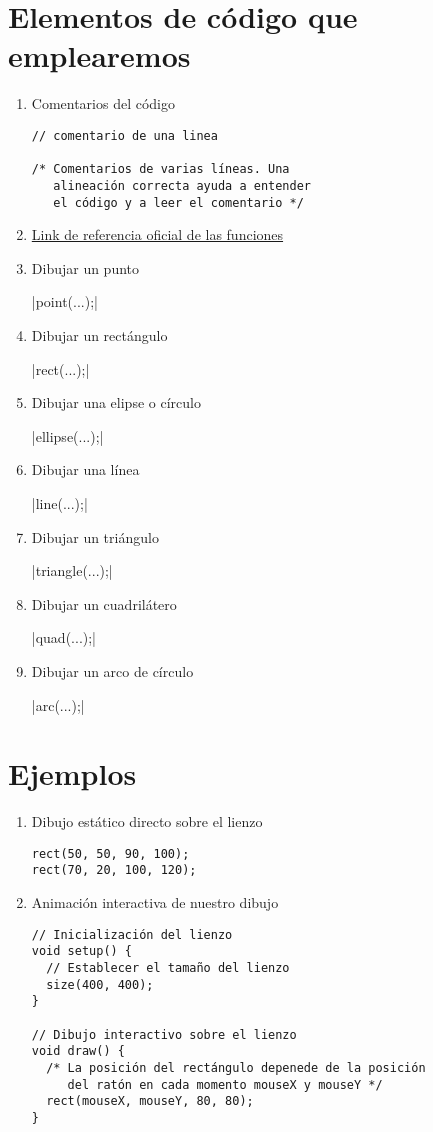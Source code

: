 \documentclass[a4paper,oneside]{article}
\begin{document}
\section{Elementos de código que emplearemos}
\begin{enumerate}
  \item Comentarios del código

    \begin{verbatim}
// comentario de una linea

/* Comentarios de varias líneas. Una
   alineación correcta ayuda a entender
   el código y a leer el comentario */
    \end{verbatim}
  \item \href{http://processing.org/reference/}{Link de referencia oficial de las funciones}
  \item Dibujar un punto

     |point(...);|
  \item Dibujar un rectángulo

     |rect(...);|
  \item Dibujar una elipse o círculo

     |ellipse(...);|
  \item Dibujar una línea

     |line(...);|
  \item Dibujar un triángulo

     |triangle(...);|
  \item Dibujar un cuadrilátero

     |quad(...);|
  \item Dibujar un arco de círculo

     |arc(...);|
\end{enumerate}


\section{Ejemplos}
\begin{enumerate}
  \item Dibujo estático directo sobre el lienzo

    \begin{verbatim}
rect(50, 50, 90, 100);
rect(70, 20, 100, 120);
    \end{verbatim}
  \item Animación interactiva de nuestro dibujo

    \begin{verbatim}
// Inicialización del lienzo
void setup() {
  // Establecer el tamaño del lienzo
  size(400, 400);
}

// Dibujo interactivo sobre el lienzo
void draw() {
  /* La posición del rectángulo depenede de la posición
     del ratón en cada momento mouseX y mouseY */
  rect(mouseX, mouseY, 80, 80);
}
    \end{verbatim}
\end{enumerate}
\end{document}
